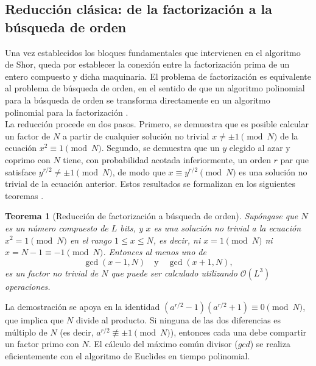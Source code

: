 \documentclass[12pt, spanish]{book}
\newtheorem{teorema}{Teorema}
\begin{document}
\subsection{Reducción clásica: de la factorización a la búsqueda de orden}
\label{sec:reduccion_clasica}

Una vez establecidos los bloques fundamentales que intervienen en el algoritmo de Shor, queda por establecer la conexión entre la factorización prima de un entero compuesto y dicha maquinaria. El problema de factorización es equivalente al problema de búsqueda de orden, en el sentido de que un algoritmo polinomial para la búsqueda de orden se transforma directamente en un algoritmo polinomial para la factorización \cite{Nielsen2024}.\\

La reducción procede en dos pasos. Primero, se demuestra que es posible calcular un factor de $N$ a partir de cualquier solución no trivial $x \neq \pm 1 \pmod{N}$ de la ecuación $x^2 \equiv 1 \pmod{N}$. Segundo, se demuestra que un $y$ elegido al azar y coprimo con $N$ tiene, con probabilidad acotada inferiormente, un orden $r$ par que satisface $y^{r/2} \neq \pm 1 \pmod{N}$, de modo que $x \equiv y^{r/2} \pmod{N}$ es una solución no trivial de la ecuación anterior. Estos resultados se formalizan en los siguientes teoremas \cite{Nielsen2024}.\\

\begin{teorema}[Reducción de factorización a búsqueda de orden]
    \label{thm:red_fac}
    Supóngase que $N$ es un número compuesto de $L$ bits, y $x$ es una solución no trivial a la ecuación $x^2 = 1 \pmod{N}$ en el rango $1 \leq x \leq N$, es decir, ni $x = 1 \pmod{N}$ ni $x = N - 1 \equiv -1 \pmod{N}$. Entonces al menos uno de
    \begin{equation}
        \gcd(x - 1, N) \quad \text{y} \quad \gcd(x + 1, N),
    \end{equation}
    es un factor no trivial de $N$ que puede ser calculado utilizando $\mathcal{O}(L^3)$ operaciones.
    \label{eq:factores}
\end{teorema}

La demostración se apoya en la identidad $(a^{r/2}-1)(a^{r/2}+1) \equiv 0 \pmod N$, que implica que $N$ divide al producto. Si ninguna de las dos diferencias es múltiplo de $N$ (es decir, $a^{r/2} \not\equiv \pm 1 \pmod N$), entonces cada una debe compartir un factor primo con $N$. El cálculo del máximo común divisor ($gcd$) se realiza eficientemente con el algoritmo de Euclides en tiempo polinomial.
\end{document}
